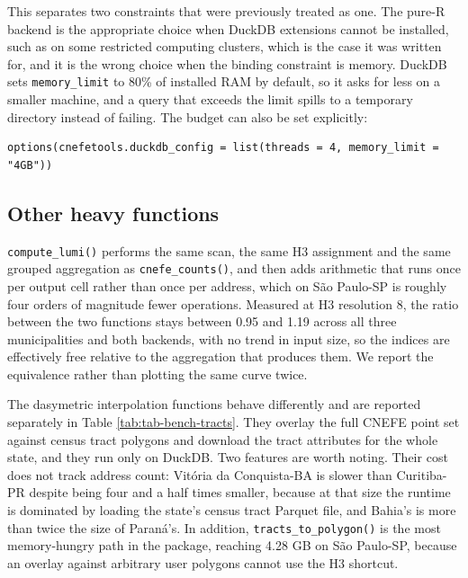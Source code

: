 This separates two constraints that were previously treated as one. The
pure-R backend is the appropriate choice when DuckDB extensions cannot
be installed, such as on some restricted computing clusters, which is
the case it was written for, and it is the wrong choice when the binding
constraint is memory. DuckDB sets \texttt{memory\_limit} to 80\% of installed RAM
by default, so it asks for less on a smaller machine, and a query that
exceeds the limit spills to a temporary directory instead of failing.
The budget can also be set explicitly:

\begin{verbatim}
options(cnefetools.duckdb_config = list(threads = 4, memory_limit = "4GB"))
\end{verbatim}

\subsection{Other heavy functions}\label{other-heavy-functions}

\texttt{compute\_lumi()} performs the same scan, the same H3 assignment and the
same grouped aggregation as \texttt{cnefe\_counts()}, and then adds arithmetic
that runs once per output cell rather than once per address, which on
São Paulo-SP is roughly four orders of magnitude fewer operations.
Measured at H3 resolution 8, the ratio between the two functions stays
between 0.95 and 1.19 across all three municipalities and both backends,
with no trend in input size, so the indices are effectively free relative
to the aggregation that produces them. We report the equivalence rather
than plotting the same curve twice.

The dasymetric interpolation functions behave differently and are
reported separately in Table \ref{tab:tab-bench-tracts}. They overlay
the full CNEFE point set against census tract polygons and download the
tract attributes for the whole state, and they run only on DuckDB. Two
features are worth noting. Their cost does not track address count:
Vitória da Conquista-BA is slower than Curitiba-PR despite being four
and a half times smaller, because at that size the runtime is dominated
by loading the state's census tract Parquet file, and Bahia's is more
than twice the size of Paraná's. In addition, \texttt{tracts\_to\_polygon()} is
the most memory-hungry path in the package, reaching 4.28 GB on São
Paulo-SP, because an overlay against arbitrary user polygons cannot use
the H3 shortcut.

